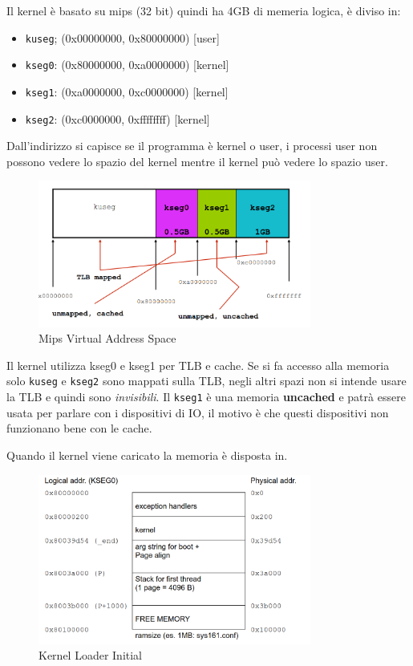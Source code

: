 \documentclass[12pt]{article}
\begin{document}
Il kernel \`e basato su mips (32 bit) quindi ha 4GB di memeria logica, \`e diviso in:
\begin{itemize}
  \item \texttt{kuseg}; (0x00000000, 0x80000000) [user]
  \item \texttt{kseg0}: (0x80000000, 0xa0000000) [kernel]
  \item \texttt{kseg1}: (0xa0000000, 0xc0000000) [kernel]
  \item \texttt{kseg2}: (0xc0000000, 0xffffffff) [kernel]
\end{itemize}
Dall'indirizzo si capisce se il programma \`e kernel o user, i processi user non possono vedere lo spazio del kernel mentre il kernel pu\`o vedere lo spazio user.
\begin{figure}[H]
  \centering
  \includegraphics[width=0.8\textwidth]{mips-virtual-address-space.png}
  \caption{Mips Virtual Address Space}
  \label{fig:mips-virtual-address-space}
\end{figure}

Il kernel utilizza kseg0 e kseg1 per TLB e cache. Se si fa accesso alla memoria solo \texttt{kuseg} e \texttt{kseg2} sono mappati sulla TLB, negli altri spazi non si intende usare la TLB e quindi sono \emph{invisibili}. Il \texttt{kseg1} \`e una memoria \textbf{uncached} e patr\`a essere usata per parlare con i dispositivi di IO, il motivo \`e che questi dispositivi non funzionano bene con le cache.

Quando il kernel viene caricato la memoria \`e disposta in.
\begin{figure}[H]
  \centering
  \includegraphics[width=0.8\textwidth]{kernel-loader-initial.png}
  \caption{Kernel Loader Initial}
  \label{fig:kernel-loader-initial}
\end{figure}
\end{document}
